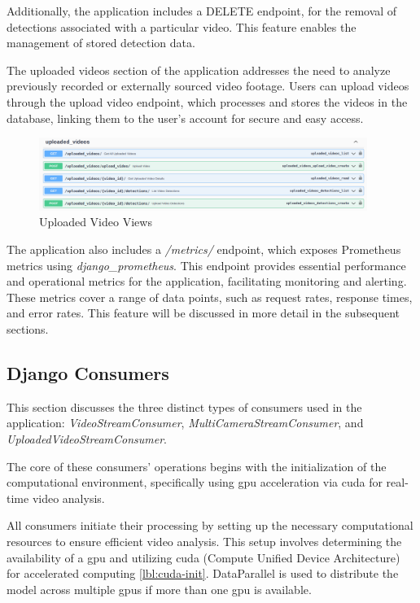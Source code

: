 Additionally, the application includes a DELETE endpoint, for the 
removal of detections associated with a particular video. This feature enables the management of stored detection data. 

The uploaded videos section of the application addresses the need to analyze previously recorded or 
externally sourced video footage. Users can upload videos through the upload video endpoint, which processes and 
stores the videos in the database, linking them to the user's account for secure and easy access.
\begin{figure}[h]
    \centering 
    \includegraphics[width=0.95\textwidth]{figs/views-videos.png} 
    \caption{Uploaded Video Views}
    \label{fig:views-video}
\end{figure}

The application also includes a \textit{/metrics/} endpoint, which exposes Prometheus metrics using 
\textit{django\_prometheus}. This endpoint provides essential performance and operational metrics for the 
application, facilitating monitoring and alerting. These metrics cover a range of data points, such as request rates, 
response times, and error rates. This feature will be discussed in more detail in the subsequent sections.


\subsection{Django Consumers}
This section discusses the three distinct types of consumers used in the 
application: \textit{VideoStreamConsumer}, \textit{MultiCameraStreamConsumer}, and \textit{UploadedVideoStreamConsumer}.

The core of these consumers' operations begins with the initialization of the computational environment, 
specifically using \ac{gpu} acceleration via \ac{cuda} for real-time video analysis.

All consumers initiate their processing by setting up the necessary computational resources to ensure efficient 
video analysis. This setup involves determining the availability of a \ac{gpu} and utilizing 
\ac{cuda} (Compute Unified Device Architecture) for accelerated computing \ref{lbl:cuda-init}. DataParallel is used 
to distribute the model across multiple \ac{gpu}s if more than one \ac{gpu} is available.

